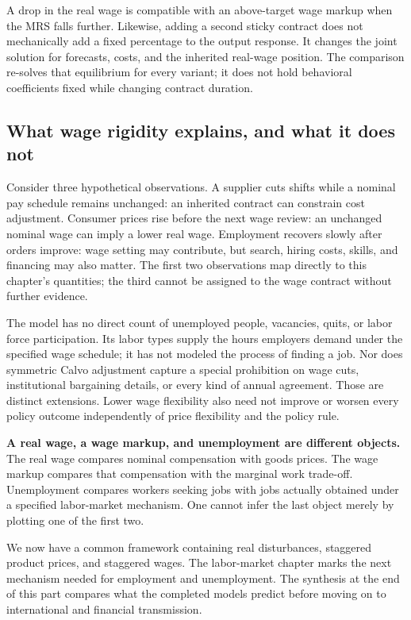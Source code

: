 A drop in the real wage is compatible with an above-target wage markup when
the MRS falls further. Likewise, adding a second sticky contract does not
mechanically add a fixed percentage to the output response. It changes the
joint solution for forecasts, costs, and the inherited real-wage position.
The comparison re-solves that equilibrium for every variant; it does not hold
behavioral coefficients fixed while changing contract duration.

\subsection{What wage rigidity explains, and what it does not}

Consider three hypothetical observations. A supplier cuts shifts while a
nominal pay schedule remains unchanged: an inherited contract can constrain
cost adjustment. Consumer prices rise before the next wage review: an unchanged
nominal wage can imply a lower real wage. Employment recovers slowly after
orders improve: wage setting may contribute, but search, hiring costs, skills,
and financing may also matter. The first two observations map directly to
this chapter's quantities; the third cannot be assigned to the wage contract
without further evidence.

The model has no direct count of unemployed people, vacancies, quits, or labor
force participation. Its labor types supply the hours employers demand under
the specified wage schedule; it has not modeled the process of finding a job.
Nor does symmetric Calvo adjustment capture a special prohibition on wage
cuts, institutional bargaining details, or every kind of annual agreement.
Those are distinct extensions. Lower wage flexibility also need not improve
or worsen every policy outcome independently of price flexibility and the
policy rule.

\begin{blueblock}
\textbf{A real wage, a wage markup, and unemployment are different objects.}
The real wage compares nominal compensation with goods prices. The wage markup
compares that compensation with the marginal work trade-off. Unemployment
compares workers seeking jobs with jobs actually obtained under a specified
labor-market mechanism. One cannot infer the last object merely by plotting
one of the first two.
\end{blueblock}

We now have a common framework containing real disturbances, staggered product
prices, and staggered wages. The labor-market chapter marks the next mechanism
needed for employment and unemployment. The synthesis at the end of this part
compares what the completed models predict before moving on to international
and financial transmission.
